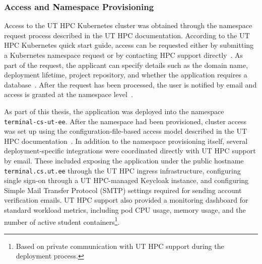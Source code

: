 \subsubsection{Access and Namespace Provisioning} \label{subsubsec:access-and-namespace-provisioning}
Access to the UT HPC Kubernetes cluster was obtained through the namespace request process described in the UT HPC documentation.
According to the UT HPC Kubernetes quick start guide, access can be requested either by submitting a Kubernetes namespace request or by contacting HPC support directly~\cite{ut_hpc_kubernetes_quick_start_2026}.
As part of the request, the applicant can specify details such as the domain name, deployment lifetime, project repository, and whether the application requires a database~\cite{ut_hpc_container_hosting_form}.
After the request has been processed, the user is notified by email and access is granted at the namespace level~\cite{ut_hpc_kubernetes_quick_start_2026}.

As part of this thesis, the application was deployed into the namespace \texttt{terminal-cs-ut-ee}.
After the namespace had been provisioned, cluster access was set up using the configuration-file-based access model described in the UT HPC documentation~\cite{ut_hpc_kubernetes_quick_start_2026}.
In addition to the namespace provisioning itself, several deployment-specific integrations were coordinated directly with UT HPC support by email.
These included exposing the application under the public hostname \texttt{terminal.cs.ut.ee} through the UT HPC ingress infrastructure, configuring single sign-on through a UT HPC-managed Keycloak instance, and configuring Simple Mail Transfer Protocol (SMTP) settings required for sending account verification emails.
UT HPC support also provided a monitoring dashboard for standard workload metrics, including pod CPU usage, memory usage, and the number of active student containers\footnote{Based on private communication with UT HPC support during the deployment process.}.

